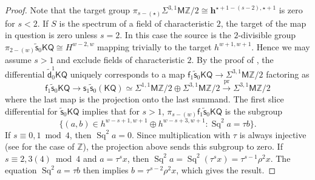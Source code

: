 \documentclass[10pt,a4paper]{amsart}
\let\iso=\cong
\newcommand{\KQ}{\mathsf{KQ}}
\newcommand{\MZ}{\mathsf{M}\Z}
\newcommand{\Sq}{\operatorname{Sq}}
\newcommand{\Z}{\mathbb{Z}}
\newcommand{\f}{\mathsf{f}}
\newcommand{\pr}{\operatorname{pr}}
\newcommand{\s}{\mathsf{s}}
\newcommand{\vd}{{\tilde{\mathsf{d}}}}
\newcommand{\vs}{\tilde{\mathsf{s}}}
\begin{document}
\begin{proof}
Note that the target group $\pi_{s-(\star)}\Sigma^{3,1}\MZ/2\cong \mathbf{h}^{\star+1-(s-2),\star+1}$ is zero for $s<2$. 
If $S$ is the spectrum of a field of characteristic $2$, the target of the map in question is zero unless $s=2$. 
In this case the source is the $2$-divisible group $\pi_{2-(w)}\vs_0\KQ\iso H^{w-2,w}$ mapping trivially to the target $h^{w+1,w+1}$.
Hence we may assume $s>1$ and exclude fields of characteristic $2$. 
By the proof of , the differential $\vd^1_0\KQ$ uniquely corresponds to a map $\f_1\vs_0\KQ\to \Sigma^{3,1}\MZ/2$ factoring as 
\[ \f_1\vs_0\KQ \to \s_1\vs_0(\KQ)\simeq \Sigma^{1,1}\MZ/2\oplus \Sigma^{3,1}\MZ/2 \xrightarrow{\pr} \Sigma^{3,1}\MZ/2\]
where the last map is the projection onto the last summand.
The first slice differential for $\vs_0\KQ$ implies that for $s>1$, $\pi_{s-(w)}\f_1\vs_0\KQ$ is the subgroup
\[ \bigl\lbrace (a,b)\in h^{w-s+1,w+1}\oplus h^{w-s+3,w+1}\colon \Sq^2a=\tau b\bigr\rbrace. \]
If $s\equiv 0,1 \bmod 4$, then $\Sq^2a=0$.
Since multiplication with $\tau$ is always injective (see  for the case of $\Z$), the projection above sends this subgroup to zero.
If $s\equiv 2,3(4) \bmod 4$ and $a=\tau^sx$, then $\Sq^2a=\Sq^2(\tau^sx)=\tau^{s-1}\rho^2x$.
The equation $\Sq^2a=\tau b$ then implies $b=\tau^{s-2}\rho^2x$, which gives the result.

\end{proof}
\end{document}
